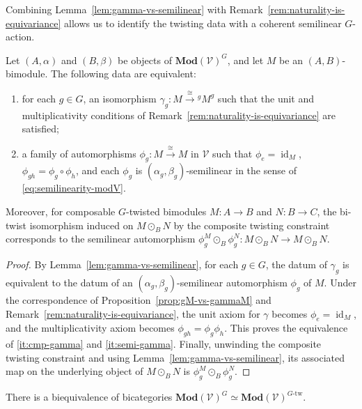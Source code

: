 \documentclass[11pt,oneside]{amsart}
\DeclareMathOperator{\id}{id}
\numberwithin{equation}{section}
\numberwithin{figure}{section}
\theoremstyle{plain}
\theoremstyle{definition}
\theoremstyle{remark}
\begin{document}
Combining Lemma~\ref{lem:gamma-vs-semilinear} with Remark~\ref{rem:naturality-is-equivariance} allows us to identify the  twisting data with a coherent semilinear $G$-action.



\begin{prop}\label{prop:comparison-vs-semilinear}
Let $(A,\alpha)$ and $(B,\beta)$ be objects of $\mathbf{Mod}(\mathcal V)^G$, and let $M$ be an $(A,B)$-bimodule.
The following data are equivalent:
\begin{enumerate}
\item\label{it:cmp-gamma}
for each $g\in G$, an isomorphism
$\gamma_g\colon M\xrightarrow{\cong} {}^gM^g$
such that the unit and multiplicativity conditions of
Remark~\ref{rem:naturality-is-equivariance} are satisfied;

\item\label{it:semi-gamma}
a family of automorphisms
$\phi_g\colon M\xrightarrow{\cong} M$
in $\mathcal V$ such that
$\phi_e=\id_M$, $\phi_{gh}=\phi_g\circ\phi_h$,
and each $\phi_g$ is $(\alpha_g,\beta_g)$-semilinear in the sense of \eqref{eq:semilinearity-modV}.
\end{enumerate}
Moreover, for composable \(G\)-twisted bimodules
\(M\colon A\to B\) and \(N\colon B\to C\), the bi-twist isomorphism
induced on \(M\odot_BN\) by the composite twisting constraint
corresponds to the semilinear automorphism
\(
\phi_g^M\odot_B\phi_g^N
\colon
M\odot_BN\to M\odot_BN.
\)
\end{prop}


\begin{proof}
By Lemma~\ref{lem:gamma-vs-semilinear}, for each $g\in G$, the datum of
$\gamma_g$ is equivalent to the datum of an
$(\alpha_g,\beta_g)$-semilinear automorphism $\phi_g$ of $M$.
Under the correspondence of Proposition~\ref{prop:gM-vs-gammaM} and
Remark~\ref{rem:naturality-is-equivariance}, the unit axiom for
$\gamma$ becomes $\phi_e=\id_M$, and the multiplicativity axiom becomes
$\phi_{gh}=\phi_g\phi_h$. This proves the equivalence of
\eqref{it:cmp-gamma} and \eqref{it:semi-gamma}.
Finally, unwinding the composite twisting constraint and using
Lemma~\ref{lem:gamma-vs-semilinear}, its associated map on the
underlying object of \(M\odot_BN\) is
\(\phi_g^M\odot_B\phi_g^N\).
\end{proof}

\begin{cor}\label{cor:equiv-mod-G}
There is a biequivalence of bicategories
\(
\mathbf{Mod}(\mathcal V)^G
\simeq
\mathbf{Mod}(\mathcal V)^{G\text{-tw}}.
\)
\end{cor}
\end{document}
